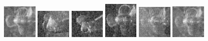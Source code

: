 \begin{figure}
    \includegraphics[width=0.15\textwidth]{chapters/images/dataset/all-class-images/propeler/propeler-35.jpg}
    \includegraphics[width=0.15\textwidth]{chapters/images/dataset/all-class-images/propeler/propeler-116.jpg}
    \includegraphics[width=0.15\textwidth]{chapters/images/dataset/all-class-images/propeler/propeler-132.jpg}
    \includegraphics[width=0.15\textwidth]{chapters/images/dataset/all-class-images/propeler/propeler-65.jpg}
    \includegraphics[width=0.15\textwidth]{chapters/images/dataset/all-class-images/propeler/propeler-83.jpg}
    \includegraphics[width=0.15\textwidth]{chapters/images/dataset/all-class-images/propeler/propeler-32.jpg}
    

\end{figure}
